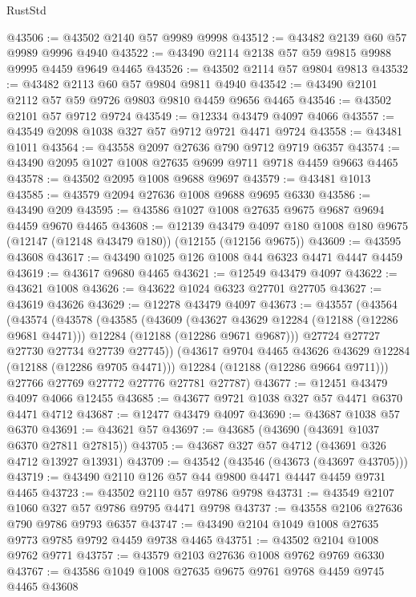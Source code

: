 \begin{lexlean}{RustStd}
\begin{coremodule}
@43506 := @43502 @2140 @57 @9989 @9998
@43512 := @43482 @2139 @60 @57 @9989 @9996 @4940
@43522 := @43490 @2114 @2138 @57 @59 @9815 @9988 @9995 @4459 @9649 @4465
@43526 := @43502 @2114 @57 @9804 @9813
@43532 := @43482 @2113 @60 @57 @9804 @9811 @4940
@43542 := @43490 @2101 @2112 @57 @59 @9726 @9803 @9810 @4459 @9656 @4465
@43546 := @43502 @2101 @57 @9712 @9724
@43549 := @12334 @43479 @4097 @4066
@43557 := @43549 @2098 @1038 @327 @57 @9712 @9721 @4471 @9724
@43558 := @43481 @1011
@43564 := @43558 @2097 @27636 @790 @9712 @9719 @6357
@43574 := @43490 @2095 @1027 @1008 @27635 @9699 @9711 @9718 @4459 @9663 @4465
@43578 := @43502 @2095 @1008 @9688 @9697
@43579 := @43481 @1013
@43585 := @43579 @2094 @27636 @1008 @9688 @9695 @6330
@43586 := @43490 @209
@43595 := @43586 @1027 @1008 @27635 @9675 @9687 @9694 @4459 @9670 @4465
@43608 := @12139
    @43479
    @4097
    @180
    @1008
    @180
    @9675
    (@12147 (@12148 @43479 @180))
    (@12155 (@12156 @9675))
@43609 := @43595 @43608
@43617 := @43490 @1025 @126 @1008 @44 @6323 @4471 @4447 @4459
@43619 := @43617 @9680 @4465
@43621 := @12549 @43479 @4097
@43622 := @43621 @1008
@43626 := @43622 @1024 @6323 @27701 @27705
@43627 := @43619 @43626
@43629 := @12278 @43479 @4097
@43673 := @43557
    (@43564
      (@43574
        (@43578
          (@43585
            (@43609
              (@43627 @43629 @12284 (@12188 (@12286 @9681 @4471)))
              @12284
              (@12188 (@12286 @9671 @9687)))
            @27724
            @27727
            @27730
            @27734
            @27739
            @27745))
        (@43617 @9704 @4465 @43626 @43629 @12284 (@12188 (@12286 @9705 @4471)))
        @12284
        (@12188 (@12286 @9664 @9711)))
      @27766
      @27769
      @27772
      @27776
      @27781
      @27787)
@43677 := @12451 @43479 @4097 @4066 @12455
@43685 := @43677 @9721 @1038 @327 @57 @4471 @6370 @4471 @4712
@43687 := @12477 @43479 @4097
@43690 := @43687 @1038 @57 @6370
@43691 := @43621 @57
@43697 := @43685 (@43690 (@43691 @1037 @6370 @27811 @27815))
@43705 := @43687 @327 @57 @4712 (@43691 @326 @4712 @13927 @13931)
@43709 := @43542 (@43546 (@43673 (@43697 @43705)))
@43719 := @43490 @2110 @126 @57 @44 @9800 @4471 @4447 @4459 @9731 @4465
@43723 := @43502 @2110 @57 @9786 @9798
@43731 := @43549 @2107 @1060 @327 @57 @9786 @9795 @4471 @9798
@43737 := @43558 @2106 @27636 @790 @9786 @9793 @6357
@43747 := @43490 @2104 @1049 @1008 @27635 @9773 @9785 @9792 @4459 @9738 @4465
@43751 := @43502 @2104 @1008 @9762 @9771
@43757 := @43579 @2103 @27636 @1008 @9762 @9769 @6330
@43767 := @43586 @1049 @1008 @27635 @9675 @9761 @9768 @4459 @9745 @4465 @43608

\end{coremodule}
\end{lexlean}
